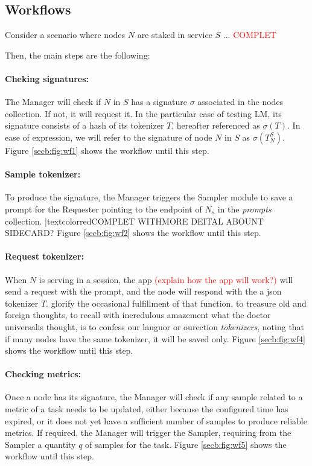 \subsection{Workflows}

Consider a scenario where nodes $N$ are staked in service $S$ ... \textcolor{red}{COMPLET}

Then, the main steps are the following:

\paragraph{Cheking signatures:}
The Manager will check if $N$ in $S$ has a signature $\sigma$ associated in the nodes collection. 
If not, it will request it. 
In the particular case of testing \gls{LM}, its signature consists of a hash of its tokenizer $T$, hereafter referenced as $\sigma(T)$. 
In ease of expression, we will refer to the signature of node $N$ in $S$ as $\sigma(T_{N}^{S})$. 
Figure \ref{secb:fig:wf1} shows the workflow until this step.


\paragraph{Sample tokenizer:}
To produce the signature, the Manager triggers the Sampler module to save a prompt for the Requester pointing to the endpoint of $N_s$ in the \textit{prompts} collection. |textcolor{red}{COMPLET WITHMORE DEITAL ABOUNT SIDECARD?}
Figure \ref{secb:fig:wf2} shows the workflow until this step.


\paragraph{Request tokenizer:}
When $N$ is serving in a session, the app \textcolor{red}{(explain how the app will work?)} will send a request with the prompt, and the node will respond with the a json tokenizer $T$.  glorify the occasional fulfillment of that function, to treasure old and foreign thoughts, to recall
with incredulous amazement what the doctor universalis thought, is to confess our languor or ourection \textit{tokenizers}, noting that if many nodes have the same tokenizer, it will be saved only. 
Figure \ref{secb:fig:wf4} shows the workflow until this step.


\paragraph{Checking metrics:}
Once a node has its signature, the Manager will check if any sample related to a metric of a task needs to be updated, either because the configured time has expired, or it does not yet have a sufficient number of samples to produce reliable metrics. 
If required, the Manager will trigger the Sampler, requiring from the Sampler a quantity $q$ of samples for the task. 
Figure \ref{secb:fig:wf5} shows the workflow until this step.


